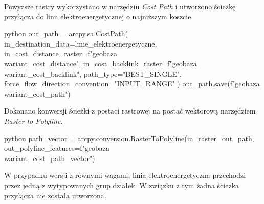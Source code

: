 \documentclass{article}
\begin{document}
Powyższe rastry wykorzystano w narzędziu \textit{Cost Path} i utworzono ścieżkę przyłącza do linii elektroenergetycznej o najniższym koszcie.
\vspace{5pt}

\begin{mintedbox}{python}
out_path = arcpy.sa.CostPath(
    in_destination_data=linie_elektroenergetyczne,
    in_cost_distance_raster=f"{geobaza}\\{wariant}_cost_distance",
    in_cost_backlink_raster=f"{geobaza}\\{wariant}_cost_backlink",
    path_type="BEST_SINGLE",
    force_flow_direction_convention="INPUT_RANGE"
)
out_path.save(f"{geobaza}\\{wariant}_cost_path")
\end{mintedbox}
\vspace{10pt}

Dokonano konwersji ścieżki z postaci rastrowej na postać wektorową narzędziem \textit{Raster to Polyline}.

\begin{mintedbox}{python}
path_vector = arcpy.conversion.RasterToPolyline(in_raster=out_path, out_polyline_features=f"{geobaza}\\{wariant}_cost_path_vector")
\end{mintedbox}
\vspace{10pt}

W przypadku wersji z równymi wagami, linia elektroenergetyczna przechodzi przez jedną z wytypowanych grup działek. W związku z tym żadna ścieżka przyłącza nie została utworzona. 
\vspace{5pt}
\end{document}
